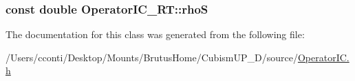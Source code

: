 \subsubsection[{rho\+S}]{\setlength{\rightskip}{0pt plus 5cm}const double Operator\+I\+C\+\_\+\+R\+T\+::rho\+S\hspace{0.3cm}{\ttfamily [protected]}}\label{class_operator_i_c___r_t_a20888d7f5cbc228ac669fc0cb0be667e}


The documentation for this class was generated from the following file\+:\begin{DoxyCompactItemize}
\item 
/\+Users/cconti/\+Desktop/\+Mounts/\+Brutus\+Home/\+Cubism\+U\+P\+\_\+D/source/\hyperlink{_operator_i_c_8h}{Operator\+I\+C.\+h}\end{DoxyCompactItemize}
